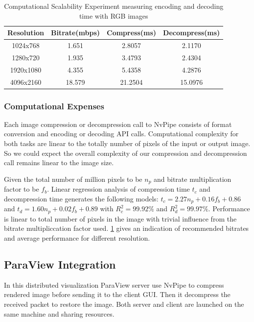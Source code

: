 \documentclass{vgtc}                          %
\begin{document}
\begin{table}[h]
  \caption{Computational Scalability Experiment measuring encoding and decoding time with RGB images}
  \label{table:experiment_setup}
  \scriptsize
  \begin{center}
    \begin{tabular}{cccc}
      Resolution & Bitrate(mbps) & Compress(ms) & Decompress(ms)\\
    \hline
      1024x768 & 1.651 & 2.8057 & 2.1170\\
      1280x720 & 1.935 & 3.4793 & 2.4304\\
      1920x1080 & 4.355 & 5.4358 & 4.2876\\
      4096x2160 & 18.579 & 21.2504 & 15.0976
    \end{tabular}
  \end{center}
\end{table}

\subsubsection{Computational Expenses}

Each image compression or decompression call to NvPipe consists of format conversion and encoding or decoding API calls. Computational complexity for both tasks are linear to the totally number of pixels of the input or output image. So we could expect the overall complexity of our compression and decompression call remains linear to the image size.

Given the total number of million pixels to be \(n_p\) and bitrate multiplication factor to be \(f_b\). Linear regression analysis of compression time \(t_c\) and decompression time generates the following models: \(t_c=2.27n_p+0.16f_b+0.86\) and \(t_d=1.60n_p+0.02f_b+0.89\) with \(R^2_c=99.92\%\) and \(R^2_d=99.97\%\). Performance is linear to total number of pixels in the image with trivial influence from the bitrate multipliccation factor used. \ref{table:experiment_setup} gives an indication of recommended bitrates and average performance for different resolution. 

\subsection{ParaView Integration}

In this distributed visualization ParaView server use NvPipe to compress rendered image before sending it to the client GUI. Then it decompress the received packet to restore the image. Both server and client are launched on the same machine and sharing resources.
\end{document}
